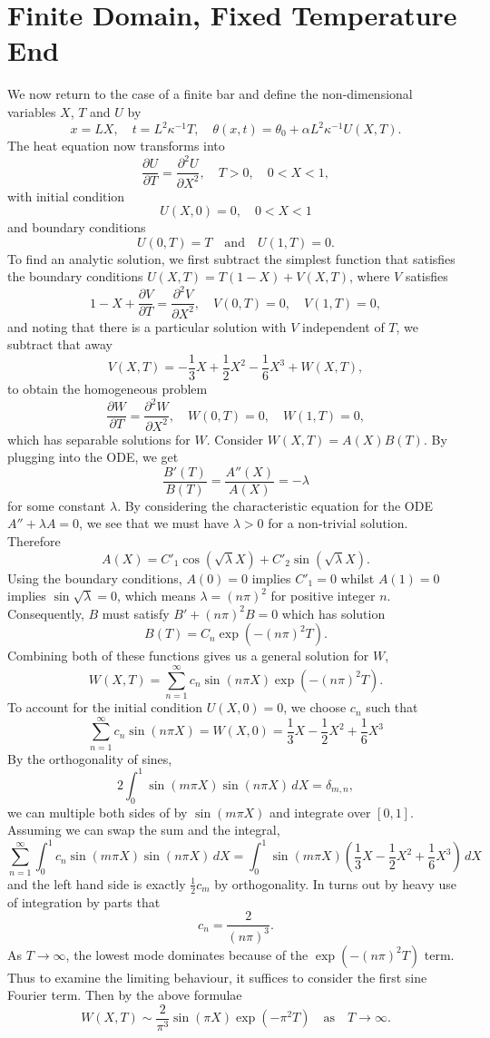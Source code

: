 \documentclass{article}
\newcommand{\pder}[2][]{\frac{\partial#1}{\partial#2}}
\newcommand{\spder}[2][]{\frac{\partial^2#1}{\partial#2^2}}
\begin{document}
\section{Finite Domain, Fixed Temperature End}
We now return to the case of a finite bar and define the non-dimensional variables \(X\), \(T\) and \(U\) by
\[ x = LX, \quad t = L^2\kappa^{-1}T, \quad \theta(x, t) = \theta_0 + \alpha L^2 \kappa^{-1} U(X, T). \]
The heat equation now transforms into
\[ \pder[U]{T} = \spder[U]{X}, \quad T > 0, \quad 0 < X < 1,  \]
with initial condition
\[ U(X, 0) = 0, \quad 0 < X < 1 \]
and boundary conditions
\[ U(0, T) = T \quad \mbox{and} \quad U(1, T) = 0. \]
To find an analytic solution, we first subtract the simplest function that satisfies the boundary conditions \(U(X, T) = T(1 - X) + V(X, T) \), where \(V\) satisfies
\[ 1-X + \pder[V]{T} = \spder[V]{X}, \quad V(0, T) = 0, \quad V(1, T) = 0, \]
and noting that there is a particular solution with \(V\) independent of \(T\), we subtract that away
\[ V(X, T) = -\frac{1}{3}X + \frac{1}{2}X^2 - \frac{1}{6}X^3 + W(X, T), \]
to obtain the homogeneous problem
\[ \pder[W]{T} = \spder[W]{X}, \quad W(0, T) = 0, \quad W(1, T) = 0, \]
which has separable solutions for \(W\). Consider \(W(X, T) = A(X)B(T) \). By plugging into the ODE, we get
\[ \frac{B'(T)}{B(T)} = \frac{A''(X)}{A(X)} = -\lambda \]
for some constant \(\lambda\). By considering the characteristic equation for the ODE \(A'' + \lambda A = 0\), we see that we must have \(\lambda > 0\) for a non-trivial solution. Therefore
\[ A(X) = C'_1\cos(\sqrt{\lambda}X) + C'_2\sin(\sqrt{\lambda}X). \]
Using the boundary conditions, \(A(0) = 0\) implies \(C'_1 = 0\) whilst \(A(1) = 0\) implies \(\sin\sqrt\lambda = 0\), which means \(\lambda = (n\pi)^2\) for positive integer \(n\). Consequently, \(B\) must satisfy \(B' + (n\pi)^2B = 0\) which has solution
\[ B(T) = C_n\exp(-(n\pi)^2T). \]
Combining both of these functions gives us a general solution for \(W\),
\[ W(X, T) = \sum_{n=1}^\infty c_n\sin(n\pi X) \exp(-(n\pi)^2T). \]
To account for the initial condition \(U(X, 0) = 0\), we choose \(c_n\) such that
\[ \sum_{n=1}^\infty c_n \sin(n \pi X) = W(X, 0) = \frac{1}{3}X - \frac{1}{2}X^2 + \frac{1}{6}X^3 \]
By the orthogonality of sines, 
\[ 2\int_0^1 \sin(m\pi X)\sin(n\pi X) \,dX = \delta_{m,n}, \]
we can multiple both sides of by \(\sin(m\pi X)\) and integrate over \([0,1]\). Assuming we can swap the sum and the integral,
\[ \sum_{n=1}^\infty \int_0^1 c_n\sin(m\pi X)\sin(n\pi X) \,dX = \int_0^1 \sin(m\pi X)\left(\frac{1}{3}X - \frac{1}{2}X^2 + \frac{1}{6}X^3\right)  \,dX  \]
and the left hand side is exactly \(\frac{1}{2}c_m\) by orthogonality. In turns out by heavy use of integration by parts that
\[ c_n = \frac{2}{(n\pi)^3}. \]
As \(T \to \infty\), the lowest mode dominates because of the \(\exp(-(n\pi)^2 T)\) term. Thus to examine the limiting behaviour, it suffices to consider the first sine Fourier term. Then by the above formulae
\[ W(X, T) \sim \frac{2}{\pi^3} \sin(\pi X) \exp(-\pi^2 T) \quad \mbox{as} \quad T \to \infty. \]
\end{document}
